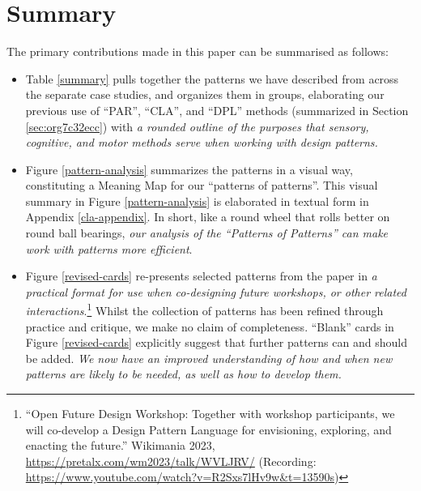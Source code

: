 \documentclass[acmlarge,timestamp]{acmart}
\begin{document}


\section{Summary}

The primary contributions made in this paper can be summarised as
follows:

\begin{itemize}
\item Table \ref{summary} pulls together the patterns we have
  described from across the separate case studies, and organizes them
  in groups, elaborating our previous use of “PAR”, “CLA”, and “DPL”
  methods (summarized in Section \ref{sec:org7c32ecc}) with \emph{a
  rounded outline of the purposes that sensory, cognitive, and motor
  methods serve when working with design patterns.}

\item Figure \ref{pattern-analysis} summarizes the patterns in a
  visual way, constituting a {\sc Meaning Map} for our “patterns of
  patterns”.  This visual summary in Figure \ref{pattern-analysis} is
  elaborated in textual form in Appendix \ref{cla-appendix}.  In
  short, like a round wheel that rolls better on round ball bearings,
  \emph{our analysis of the “Patterns of Patterns” can make work with
  patterns more efficient}.

\item Figure \ref{revised-cards} re-presents selected patterns from
  the paper in \emph{a practical format for use when co-designing
  future workshops, or other related interactions}.\footnote{``Open
  Future Design Workshop: Together with workshop participants, we will
  co-develop a Design Pattern Language for envisioning, exploring, and
  enacting the future.”  Wikimania 2023,
  \url{https://pretalx.com/wm2023/talk/WVLJRV/} (Recording:
  \url{https://www.youtube.com/watch?v=R2Sxs7lHv9w&t=13590s})} Whilst
  the collection of patterns has been refined through practice and
  critique, we make no claim of completeness.  “Blank” cards in Figure
  \ref{revised-cards} explicitly suggest that further patterns can and
  should be added.  \emph{We now have an improved understanding of how
  and when new patterns are likely to be needed, as well as how to
  develop them.}
\end{itemize}
\end{document}
